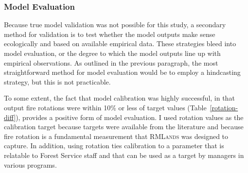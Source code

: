 \subsubsection*{Model Evaluation} \label{subsubsec:modelevaluation} Because true model validation was not possible for this study, a secondary method for validation is to test whether the model outputs make sense ecologically and based on available empirical data. These strategies bleed into model evaluation, or the degree to which the model outputs line up with empirical observations. As outlined in the previous paragraph, the most straightforward method for model evaluation would be to employ a hindcasting strategy, but this is not practicable. 

To some extent, the fact that model calibration was highly successful, in that output fire rotations were within 10\% or less of target values (Table~\ref{rotation-diff}), provides a positive form of model evaluation. I used rotation values as the calibration target because targets were available from the literature and because fire rotation is a fundamental measurement that \textsc{RMLands} was designed to capture. In addition, using rotation ties calibration to a parameter that is relatable to Forest Service staff and that can be used as a target by managers in various programs. 

